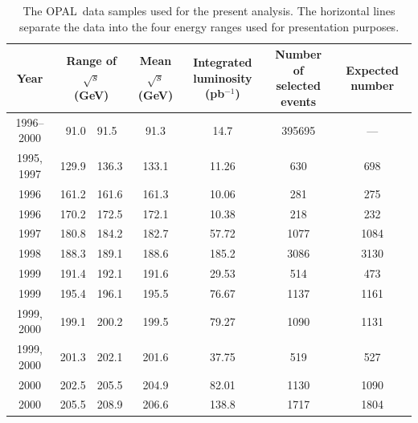 \documentclass[12pt,a4paper,twoside]{article}
\newcommand{\Opal}{\mbox{\rm OPAL}}
\begin{document}
\begin{table}
\begin{center}
\begin{tabular}{| c | r@{$\;$--$\;$}l | c | c | c |c|}
\hline
Year &
\multicolumn{2}{|c|}{\parbox{2.5cm}{\centering Range of $\sqrt{s}$\\(GeV)}} &
\multicolumn{1}{|c|}{\parbox{2.5cm}{\centering Mean $\sqrt{s}$\\(GeV)}} &
\multicolumn{1}{|c|}{\parbox{2.1cm}{\centering \rule{0pt}{0.4cm}Integrated\\luminosity (pb$^{-1}$)\rule[-0.2cm]{0pt}{0pt}}} &
\multicolumn{1}{|c|}{\parbox{2.5cm}{\centering Number of\\selected events}} & 
\multicolumn{1}{|c|}{\parbox{2.5cm}{\centering Expected number}} 
\\ \hline
1996--2000 &  91.0 &  91.5 &  91.3 &  14.7 & 395695& ---\\
\hline
1995, 1997 & 129.9 & 136.3 & 133.1 &  11.26 & 630 & 698\\
\hline
1996       & 161.2 & 161.6 & 161.3 & 10.06 & 281 & 275\\
1996       & 170.2 & 172.5 & 172.1 & 10.38 & 218 & 232\\
1997       & 180.8 & 184.2 & 182.7 & 57.72 & 1077 & 1084\\
\hline
1998       & 188.3 & 189.1 & 188.6 & 185.2 & 3086 & 3130\\
1999       & 191.4 & 192.1 & 191.6 & 29.53 & 514 & 473\\
1999       & 195.4 & 196.1 & 195.5 & 76.67 & 1137 & 1161\\
1999, 2000 & 199.1 & 200.2 & 199.5 & 79.27 & 1090 & 1131\\
1999, 2000 & 201.3 & 202.1 & 201.6 & 37.75 & 519 & 527\\
2000       & 202.5 & 205.5 & 204.9 & 82.01 & 1130 & 1090\\
2000       & 205.5 & 208.9 & 206.6 & 138.8 & 1717 & 1804\\
\hline
\end{tabular}
\end{center}
\caption{The \Opal\ data samples used for the present analysis.
The horizontal lines separate the data into the four energy ranges 
used for presentation purposes.}
\label{datasummary}
\end{table}
\end{document}
